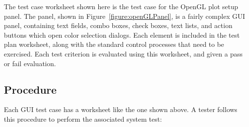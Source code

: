 \noindent The test case worksheet shown here is the test case for the OpenGL plot setup panel.
The panel, shown in Figure~\ref{figure:openGLPanel}, is a fairly complex GUI panel,
containing text fields, combo boxes, check boxes, text lists, and action buttons which open color
selection dialogs.  Each element is included in the test plan worksheet, along with the standard
control processes that need to be exercised.  Each test criterion is evaluated using this worksheet,
and given a pass or fail evaluation.

\subsection{Procedure}

Each GUI test case has a worksheet like the one shown above.  A tester follows this procedure to
perform the associated system test:

